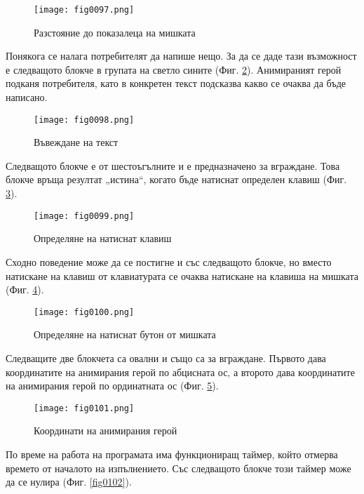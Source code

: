 \begin{figure}[H]
  \centering
  \texttt{[image: fig0097.png]}
  \caption{Разстояние до показалеца на мишката}
\label{fig0097}
\end{figure}

Понякога се налага потребителят да напише нещо. За да се даде тази възможност е следващото блокче в групата на светло сините (Фиг. \ref{fig0098}). Анимираният герой подканя потребителя, като в конкретен текст подсказва какво се очаква да бъде написано. 

\begin{figure}[H]
  \centering
  \texttt{[image: fig0098.png]}
  \caption{Въвеждане на текст}
\label{fig0098}
\end{figure}

Следващото блокче е от шестоъгълните и е предназначено за вграждане. Това блокче връща резултат „истина“, когато бъде натиснат определен клавиш (Фиг. \ref{fig0099}).

\begin{figure}[H]
  \centering
  \texttt{[image: fig0099.png]}
  \caption{Определяне на натиснат клавиш}
\label{fig0099}
\end{figure}

Сходно поведение може да се постигне и със следващото блокче, но вместо натискане на клавиш от клавиатурата се очаква натискане на клавиша на мишката (Фиг. \ref{fig0100}).

\begin{figure}[H]
  \centering
  \texttt{[image: fig0100.png]}
  \caption{Определяне на натиснат бутон от мишката}
\label{fig0100}
\end{figure}

Следващите две блокчета са овални и също са за вграждане. Първото дава координатите на анимирания герой по абцисната ос, а второто дава координатите на анимирания герой по ординатната ос (Фиг. \ref{fig0101}).

\begin{figure}[H]
  \centering
  \texttt{[image: fig0101.png]}
  \caption{Координати на анимирания герой}
\label{fig0101}
\end{figure}

По време на работа на програмата има функциониращ таймер, който отмерва времето от началото на изпълнението. Със следващото блокче този таймер може да се нулира (Фиг. \ref{fig0102}).

